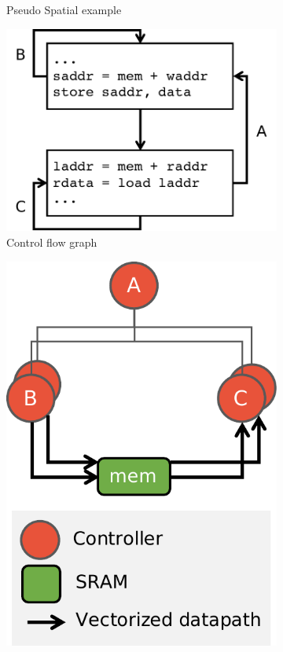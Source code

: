 \begin{figure}
\centering
\begin{subfigure}[b]{0.35\textwidth}
\inputminted{python}{code/spatialegpar.py}
\caption{Pseudo Spatial example}
\end{subfigure}
\hfill
\begin{subfigure}[b]{0.32\textwidth}
\includegraphics[width=1\textwidth]{figs/controlflow.pdf}
\caption{Control flow graph}
\end{subfigure}
\hfill
\begin{subfigure}[b]{0.25\textwidth}
\includegraphics[width=1\textwidth]{figs/spatialir.pdf}

\end{subfigure}
\end{figure}
